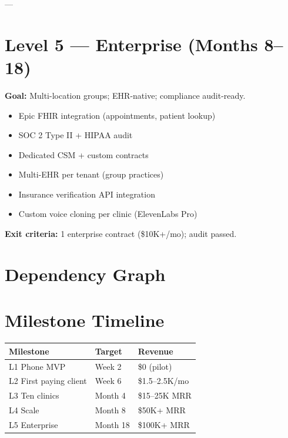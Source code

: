 \documentclass[11pt,a4paper]{article}
\begin{document}
---

\section{Level 5 --- Enterprise (Months 8--18)}

\textbf{Goal:} Multi-location groups; EHR-native; compliance audit-ready.

\begin{itemize}[nosep]
  \item Epic FHIR integration (appointments, patient lookup)
  \item SOC 2 Type II + HIPAA audit
  \item Dedicated CSM + custom contracts
  \item Multi-EHR per tenant (group practices)
  \item Insurance verification API integration
  \item Custom voice cloning per clinic (ElevenLabs Pro)
\end{itemize}

\textbf{Exit criteria:} 1 enterprise contract (\$10K+/mo); audit passed.

\section{Dependency Graph}

\begin{center}
\end{center}

\section{Milestone Timeline}

\begin{center}
\begin{tabular}{@{}lll@{}}
\toprule
\textbf{Milestone} & \textbf{Target} & \textbf{Revenue} \\
\midrule
L1 Phone MVP & Week 2 & \$0 (pilot) \\
L2 First paying client & Week 6 & \$1.5--2.5K/mo \\
L3 Ten clinics & Month 4 & \$15--25K MRR \\
L4 Scale & Month 8 & \$50K+ MRR \\
L5 Enterprise & Month 18 & \$100K+ MRR \\
\bottomrule
\end{tabular}
\end{center}
\end{document}
